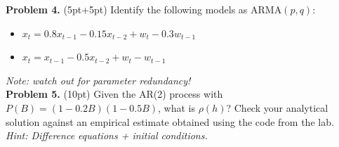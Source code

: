 \documentclass[12pt]{article}
\begin{document}

\noindent \textbf{Problem 4.} (5pt+5pt) Identify the following models as $\mathrm{ARMA}(p,q)$:
\begin{itemize}
\item $x_t = 0.8 x_{t-1} - 0.15 x_{t-2} + w_t - 0.3 w_{t-1}$
\item $x_t =  x_{t-1} - 0.5 x_{t-2} + w_t - w_{t-1}$
\end{itemize}
\emph{Note: watch out for parameter redundancy!}\\


\noindent \textbf{Problem 5.} (10pt) Given the AR(2) process with $P(B) = (1-0.2B)(1-0.5B)$, what is $\rho(h)$? 
 Check your analytical solution against an empirical estimate obtained using the code from the lab.\\
\emph{Hint: Difference equations + initial conditions.}\\
\end{document}
